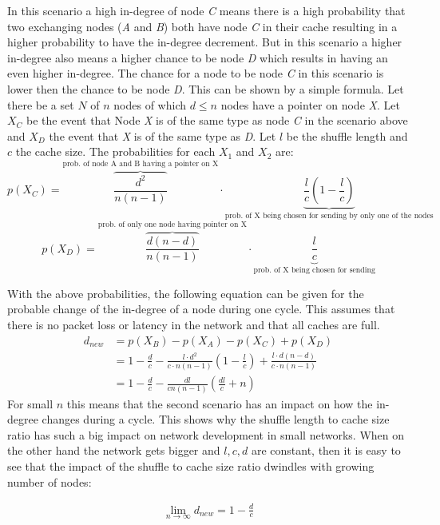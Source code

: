 In this scenario a high in-degree of node \emph{C} means there is a high
probability that two exchanging nodes (\emph{A} and \emph{B}) both have node
\emph{C} in their cache resulting in a higher probability to have the in-degree
decrement. But in this scenario a higher in-degree also means a higher chance to
be node \emph{D} which results in having an even higher in-degree. The chance
for a node to be node \emph{C} in this scenario is lower then the chance to be
node \emph{D}. This can be shown by a simple formula. Let there be a set $N$ of
$n$ nodes of which $d\leq n$ nodes have a pointer on node \emph{X}. Let $X_C$ be
the event that Node \emph{X} is of the same type as node \emph{C} in the
scenario above and $X_D$ the event that \emph{X} is of the same type as
\emph{D}.
Let $l$ be the shuffle length and $c$ the cache size.
The probabilities for each $X_1$ and $X_2$ are:
\[p(X_C) =
\overbrace{\frac{d^2}{n(n-1)}}^{\text{prob. of node A and B having a pointer on
X}} \cdot\underbrace{\frac{l}{c}(1-\frac{l}{c})}_{\text{prob. of X 
being chosen for sending by only one of the nodes}} \]
\[p(X_D) =
\overbrace{\frac{d(n-d)}{n(n-1)}}^{\text{prob. of only one node having
pointer on X}}
\cdot\underbrace{\frac{l}{c}}_{\text{prob. of X being chosen for sending}}\]

With the above probabilities, the following equation can be given for the
probable change of the in-degree of a node during one cycle. This assumes that
there is no packet loss or latency in the network and that all caches are full.
\begin{align*}
	d_{new} &= p(X_B) - p(X_A) - p(X_C) + p(X_D) \\
	&= 1 - \frac{d}{c} - \frac{l\cdot d^2}{c\cdot n(n-1)}(1-\frac{l}{c}) 
+ \frac{l\cdot d(n-d)}{c\cdot n(n-1)} \\
	&= 1 - \frac{d}{c} - \frac{dl}{cn(n-1)}\left(\frac{dl}{c}+ n \right)
\end{align*}
For small $n$ this means that the second scenario has an impact on how the
in-degree changes during a cycle. This shows why the shuffle length to cache
size ratio has such a big impact on network development in small networks. When
on the other hand the network gets bigger and $l,c,d$ are constant, then it is easy
to see that the impact of the shuffle to cache size ratio dwindles with growing
number of nodes:

\begin{align*}
\lim_{n \to \infty} d_{new} = 1 - \frac{d}{c}
\end{align*}

